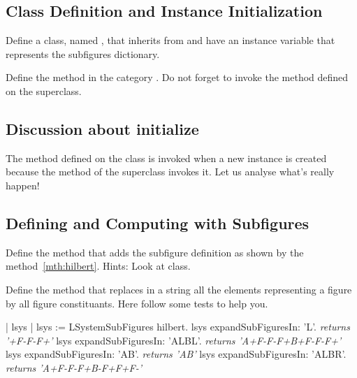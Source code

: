 \subsection{Class Definition and Instance Initialization}
Define a class, named , that inherits from
 and have an instance variable that represents the
subfigures dictionary.

Define the method  in the category
. Do not forget to invoke the 
method defined on the superclass.

\subsection{Discussion about initialize}
The method  defined on the class 
is invoked when a new instance is created because the method 
of the superclass invokes it. Let us analyse what's really happen!


\subsection{Defining and Computing with Subfigures}
Define the method  that adds the subfigure definition as shown by the
method~\ref{mth:hilbert}. Hints: Look at  class. 

Define the method  that replaces in a
string all the elements representing a figure by all figure
constituants.  Here follow some tests to help you.

\begin{scriptwithouttitle}
| lsys |
lsys := LSystemSubFigures hilbert.
lsys expandSubFiguresIn: 'L'.      
\emph{returns '+F-F-F+'}
lsys expandSubFiguresIn: 'ALBL'.      
\emph{returns 'A+F-F-F+B+F-F-F+'}
lsys expandSubFiguresIn: 'AB'. 
\emph{returns 'AB'}
lsys expandSubFiguresIn: 'ALBR'. 
\emph{returns 'A+F-F-F+B-F+F+F-'}
\end{scriptwithouttitle}



